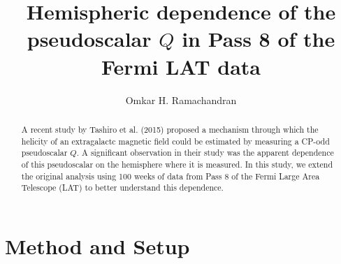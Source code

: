 \documentclass[english]{article}
\begin{document}
\title{Hemispheric dependence of the pseudoscalar $Q$ in Pass 8 of the Fermi LAT data}
\author{Omkar H. Ramachandran}

\maketitle

\begin{abstract}
A recent study by Tashiro et al. (2015) proposed a mechanism through which the 
helicity of an extragalactc magnetic field could be estimated by measuring
a CP-odd pseudoscalar $Q$.
A significant observation in their study was the apparent dependence of
this pseudoscalar on the hemisphere where it is measured. 
In this study, we extend the original analysis using 100 weeks of data from 
Pass 8 of the Fermi Large Area Telescope (LAT) to better understand this 
dependence.
\end{abstract}

\section{Method and Setup}
\end{document}
